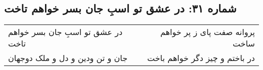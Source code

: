 \begin{center}
\section*{شماره ۳۱: در عشق تو اسبِ جان بسر خواهم تاخت}
\label{sec:031}
\begin{longtable}{l p{0.5cm} r}
در عشق تو اسبِ جان بسر خواهم تاخت
&&
پروانه صفت پای ز پر خواهم ساخت
\\
جان و تن ودین و دل و ملک دوجهان
&&
در باختم و چیز دگر خواهم باخت
\\
\end{longtable}
\end{center}
